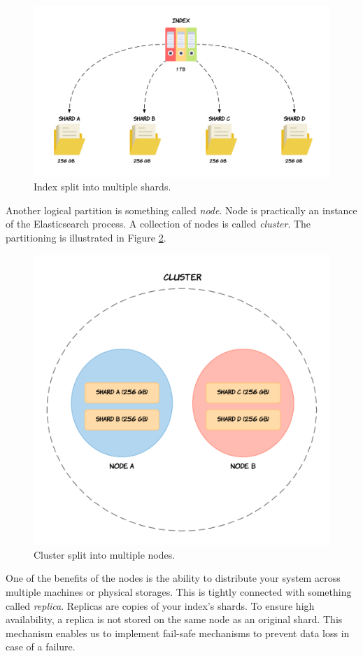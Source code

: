 \documentclass[12pt,a4,twoside]{article}
\begin{document}
\begin{figure}[h]
\centering
\includegraphics[width=1\textwidth]{figures/sharding.png}
\caption{Index split into multiple shards. \cite{understanding_sharding}}
\label{fig:sharding}
\end{figure}

Another logical partition is something called \textit{node}. Node is practically an instance of the Elasticsearch process. A collection of nodes is called \textit{cluster}. The partitioning is illustrated in Figure \ref{fig:cluster}.

\begin{figure}[t]
\centering
\includegraphics[width=.75\textwidth]{figures/cluster.png}
\caption{Cluster split into multiple nodes. \cite{understanding_sharding}}
\label{fig:cluster}
\end{figure}

One of the benefits of the nodes is the ability to distribute your system across multiple machines or physical storages. This is tightly connected with something called \textit{replica}. Replicas are copies of your index's shards. To ensure high availability, a replica is not stored on the same node as an original shard. This mechanism enables us to implement fail-safe mechanisms to prevent data loss in case of a failure.
\end{document}
